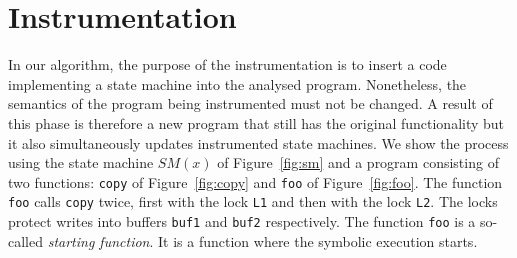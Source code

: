 \documentclass[10pt]{llncs}
\newcommand\Color[2]{\textcolor{#1}{#2}}
\newcommand{\SM}{{\textit{SM}}}
\newcommand{\DEL}[1]{\Color{red}{#1}}
\renewcommand{\DEL}[1]{}
\begin{document}



\section{Instrumentation} \label{sec:instr}

In our algorithm, the purpose of the instrumentation is to insert a code
implementing a state machine into the analysed program. Nonetheless, the
semantics of the program being instrumented must not be changed. A result of
this phase is therefore a new program that still has the original
functionality but it also simultaneously updates instrumented state machines.
We show the process using the state machine $\SM(x)$ of Figure~\ref{fig:sm}
and a program consisting of two functions: \texttt{copy} of
Figure~\ref{fig:copy} and \texttt{foo} of Figure~\ref{fig:foo}.  The function
\texttt{foo} calls \texttt{copy} twice, first with the lock \texttt{L1} and
then with the lock \texttt{L2}. The locks protect writes into buffers
\texttt{buf1} and \texttt{buf2} respectively. The function \texttt{foo} is a
so-called \emph{starting function}. It is a function where the symbolic
execution starts.
\end{document}
